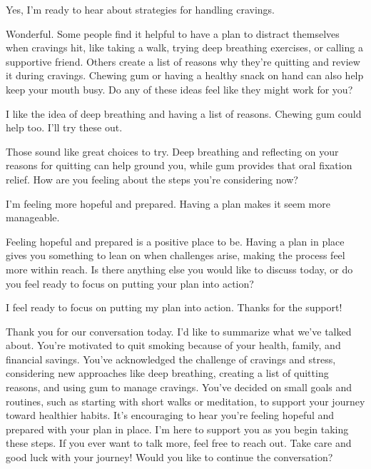 \begin{clientbox}
	Yes, I'm ready to hear about strategies for handling cravings.
\end{clientbox}

\begin{counsellorbox}
	Wonderful. Some people find it helpful to have a plan to distract themselves when cravings hit, like taking a walk, trying deep breathing exercises, or calling a supportive friend. Others create a list of reasons why they're quitting and review it during cravings. Chewing gum or having a healthy snack on hand can also help keep your mouth busy. Do any of these ideas feel like they might work for you?
\end{counsellorbox}

\begin{clientbox}
	I like the idea of deep breathing and having a list of reasons. Chewing gum could help too. I'll try these out.
\end{clientbox}

\begin{counsellorbox}
	Those sound like great choices to try. Deep breathing and reflecting on your reasons for quitting can help ground you, while gum provides that oral fixation relief. How are you feeling about the steps you're considering now?
\end{counsellorbox}

\begin{clientbox}
	I'm feeling more hopeful and prepared. Having a plan makes it seem more manageable.
\end{clientbox}

\begin{counsellorbox}
	Feeling hopeful and prepared is a positive place to be. Having a plan in place gives you something to lean on when challenges arise, making the process feel more within reach. Is there anything else you would like to discuss today, or do you feel ready to focus on putting your plan into action?
\end{counsellorbox}

\begin{clientbox}
	I feel ready to focus on putting my plan into action. Thanks for the support!
\end{clientbox}

\begin{counsellorbox}
	Thank you for our conversation today. I'd like to summarize what we've talked about. You're motivated to quit smoking because of your health, family, and financial savings. You've acknowledged the challenge of cravings and stress, considering new approaches like deep breathing, creating a list of quitting reasons, and using gum to manage cravings. You've decided on small goals and routines, such as starting with short walks or meditation, to support your journey toward healthier habits. It's encouraging to hear you're feeling hopeful and prepared with your plan in place. I'm here to support you as you begin taking these steps. If you ever want to talk more, feel free to reach out. Take care and good luck with your journey! Would you like to continue the conversation?
\end{counsellorbox}

